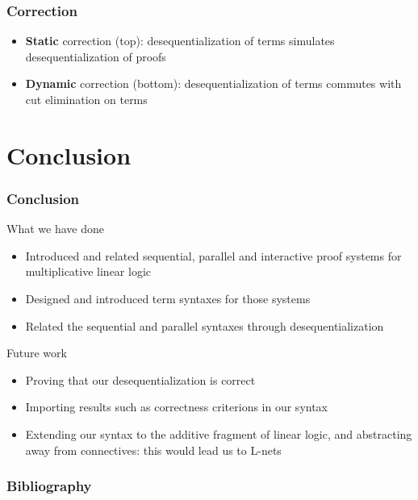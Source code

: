 \documentclass[usenames,dvipsnames]{beamer}
\newcommand{\dai}{✠}
\newcommand{\cutred}{\rightsquigarrow}
\begin{document}
\begin{frame}[fragile]
    \frametitle{Correction}
    \small
    \vspace{-2em}
    \begin{mathpar}
    \end{mathpar}
    \vspace{-2em}
    \begin{itemize}
        \item \textbf{Static} correction (top): desequentialization of terms simulates desequentialization of proofs
        \item \textbf{Dynamic} correction (bottom): desequentialization of terms commutes with cut elimination on terms
    \end{itemize}
\end{frame}

\section*{Conclusion}

\begin{frame}
    \frametitle{Conclusion}
    \begin{block}{What we have done}
        \begin{itemize}
        \item Introduced and related sequential, parallel and interactive proof systems for
        multiplicative linear logic
        \item Designed and introduced term syntaxes for those systems
        \item Related the sequential and parallel syntaxes through desequentialization
        \end{itemize}
    \end{block}
    \begin{block}{Future work}
        \begin{itemize}
        \item Proving that our desequentialization is correct
        \item Importing results such as correctness criterions in our syntax
        \item Extending our syntax to the additive fragment of linear logic, and abstracting
        away from connectives: this would lead us to L-nets
        \end{itemize}
    \end{block}
\end{frame}

\begin{frame}
    \frametitle{Bibliography}
    
    
\end{frame}
\end{document}
